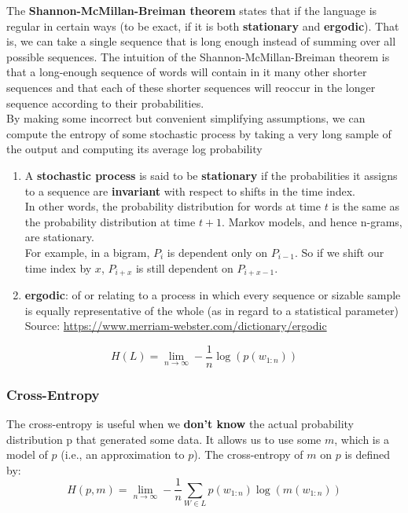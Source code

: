The \textbf{Shannon-McMillan-Breiman theorem} states that if the language is regular in certain ways (to be exact, if it is both \textbf{stationary} and \textbf{ergodic}). That is, we can take a single sequence that is long enough instead of summing over all possible sequences. The intuition of the Shannon-McMillan-Breiman theorem is that a long-enough sequence of words will contain in it many other shorter sequences and that each of these shorter sequences will reoccur in the longer sequence according to their probabilities.\\By making some incorrect but convenient simplifying assumptions, we can compute the entropy of some stochastic process by taking a very long sample of the output and computing its average log probability

\begin{enumerate}
    \item A \textbf{stochastic process} is said to be \textbf{stationary} if the probabilities it assigns to a sequence are \textbf{invariant} with respect to shifts in the time index.\\ In other words, the probability distribution for words at time $t$ is the same as the probability distribution at time $t + 1$. Markov models, and hence n-grams, are stationary.\\ For example, in a bigram, $P_i$ is dependent only on $P_{i-1}$. So if we shift our time index by $x$, $P_{i+x}$ is still dependent on $P_{i+x-1}$.
    \item \textbf{ergodic}: of or relating to a process in which every sequence or sizable sample is equally representative of the whole (as in regard to a statistical parameter)\\
    Source: \href{https://www.merriam-webster.com/dictionary/ergodic}{https://www.merriam-webster.com/dictionary/ergodic}
\end{enumerate}

\[
    H(L) = \lim_{n \rightarrow \infty} -\dfrac{1}{n} \log(p(w_{1:n}))
\]

\subsubsection{Cross-Entropy}
The cross-entropy is useful when we \textbf{don’t know} the actual probability distribution p that generated some data. It allows us to use some $m$, which is a model of $p$ (i.e., an approximation to $p$). The
cross-entropy of $m$ on $p$ is defined by:
\[
    H(p,m) = \lim_{n \rightarrow \infty} - \dfrac{1}{n}\sum_{W\in L} p(w_{1:n})\log(m(w_{1:n}))
\]

